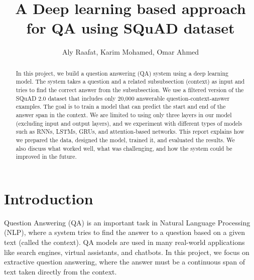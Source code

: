 \documentclass[runningheads]{llncs}
\begin{document}
	\title{A Deep learning based approach for QA using SQuAD dataset}
	\author{Aly Raafat, Karim Mohamed, Omar Ahmed}
	\maketitle              %
	
	\begin{abstract}
		In this project, we build a question answering (QA) system using a deep learning model. The system takes a question and a related subsubsection (context) as input and tries to find the correct answer from the subsubsection. We use a filtered version of the SQuAD 2.0 dataset that includes only 20,000 answerable question-context-answer examples. The goal is to train a model that can predict the start and end of the answer span in the context. We are limited to using only three layers in our model (excluding input and output layers), and we experiment with different types of models such as RNNs, LSTMs, GRUs, and attention-based networks. This report explains how we prepared the data, designed the model, trained it, and evaluated the results. We also discuss what worked well, what was challenging, and how the system could be improved in the future.
	
	\end{abstract}
	\section{Introduction}
	Question Answering (QA) is an important task in Natural Language Processing (NLP), where a system tries to find the answer to a question based on a given text (called the context). QA models are used in many real-world applications like search engines, virtual assistants, and chatbots. In this project, we focus on extractive question answering, where the answer must be a continuous span of text taken directly from the context.
    \\
    \par
\end{document}
